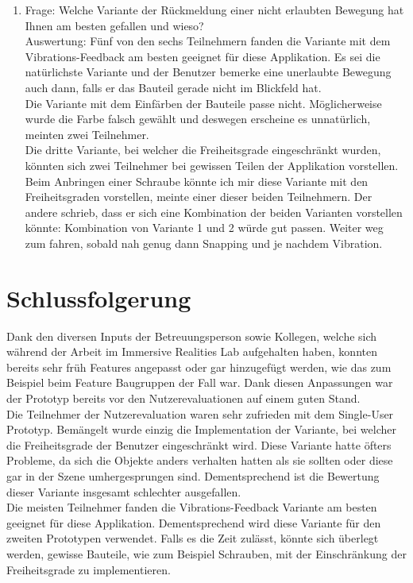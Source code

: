 \begin{enumerate} [itemsep=2pt]
	\item Frage: Welche Variante der Rückmeldung einer nicht erlaubten Bewegung hat Ihnen am besten gefallen und wieso? \\
	Auswertung: Fünf von den sechs Teilnehmern fanden die Variante mit dem Vibrations-Feedback am besten geeignet für diese Applikation. Es sei die natürlichste Variante und der Benutzer bemerke eine unerlaubte Bewegung auch dann, falls er das Bauteil gerade nicht im Blickfeld hat. \\
	Die Variante mit dem Einfärben der Bauteile passe nicht. Möglicherweise wurde die Farbe falsch gewählt und deswegen erscheine es unnatürlich, meinten zwei Teilnehmer. \\
	Die dritte Variante, bei welcher die Freiheitsgrade eingeschränkt wurden, könnten sich zwei Teilnehmer bei gewissen Teilen der Applikation vorstellen. \grqq Beim Anbringen einer Schraube könnte ich mir diese Variante mit den Freiheitsgraden vorstellen\grqq{}, meinte einer dieser beiden Teilnehmern. Der andere schrieb, dass er sich eine Kombination der beiden Varianten vorstellen könnte: \grqq Kombination von Variante 1 und 2 würde gut passen. Weiter weg zum fahren, sobald nah genug dann Snapping und je nachdem Vibration.\grqq{}
\end{enumerate}

\pagebreak
\section{Schlussfolgerung}
Dank den diversen Inputs der Betreuungsperson sowie Kollegen, welche sich während der Arbeit im Immersive Realities Lab aufgehalten haben, konnten bereits sehr früh Features angepasst oder gar hinzugefügt werden, wie das zum Beispiel beim Feature Baugruppen der Fall war. Dank diesen Anpassungen war der Prototyp bereits vor den Nutzerevaluationen auf einem guten Stand. \\

\noindent Die Teilnehmer der Nutzerevaluation waren sehr zufrieden mit dem Single-User Prototyp. Bemängelt wurde einzig die Implementation der Variante, bei welcher die Freiheitsgrade der Benutzer eingeschränkt wird. Diese Variante hatte öfters Probleme, da sich die Objekte anders verhalten hatten als sie sollten oder diese gar in der Szene umhergesprungen sind. Dementsprechend ist die Bewertung dieser Variante insgesamt schlechter ausgefallen. \\

\noindent Die meisten Teilnehmer fanden die Vibrations-Feedback Variante am besten geeignet für diese Applikation. Dementsprechend wird diese Variante für den zweiten Prototypen verwendet. Falls es die Zeit zulässt, könnte sich überlegt werden, gewisse Bauteile, wie zum Beispiel Schrauben, mit der Einschränkung der Freiheitsgrade zu implementieren.

